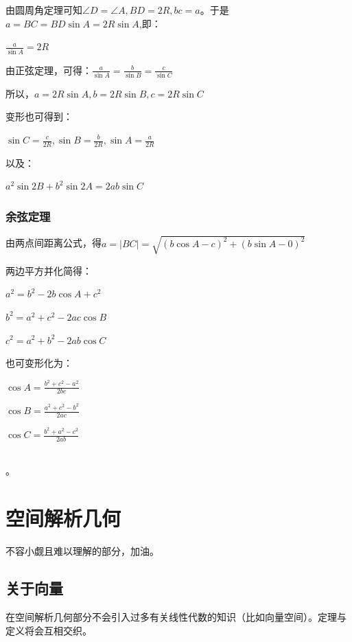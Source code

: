 \documentclass[UTF8]{ctexbook}
\begin{document}
{{{由圆周角定理可知$\angle D = \angle A,BD = 2R,bc = a$。于是$a = BC = BD\sin A = 2R\sin A$,即：

$\frac{a}{\sin A} = 2R$

由正弦定理，可得：$\frac{a}{\sin A} = \frac{b}{\sin B} = \frac{c}{\sin C}$

所以，$a = 2R\sin A,b = 2R\sin B,c = 2R\sin C$

变形也可得到：

$\sin C = \frac{c}{2R},\sin B = \frac{b}{2R},\sin A = \frac{a}{2R}$

以及：

$a^2\sin2B + b^2\sin2A = 2ab\sin C$
}%

\subsubsection{余弦定理}{
  由两点间距离公式，得$a = |BC| = \sqrt{(b\cos A - c)^2 + (b\sin A - 0)^2}$

  两边平方并化简得：

  $a^2 = b^2 - 2b\cos A + c^2$

  $b^2 = a^2 + c^2 - 2ac\cos B$

  $c^2 = a^2 + b^2 - 2ab\cos C$

  也可变形化为：

  $\cos A = \frac{b^2 + c^2 - a^2}{2bc}$

  $\cos B = \frac{a^2 + c^2 - b^2}{2ac}$

  $\cos C = \frac{b^2 + a^2 - c^2}{2ab}$
}%
\\

。

}%

\section{空间解析几何}{
  不容小觑且难以理解的部分，加油。

  \subsection{关于向量}{
    在空间解析几何部分不会引入过多有关线性代数的知识（比如向量空间）。定理与定义将会互相交织。

}}}
\end{document}
